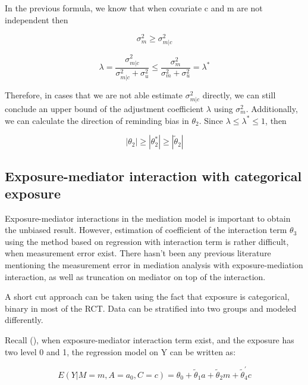 \documentclass{article}
\begin{document}
In the previous formula, we know that when covariate c and m are not independent then


\begin{equation}
\sigma^2_{m}  \ge \sigma^2_{m|c}
\end{equation}

\begin{equation}
 \lambda = \frac{\sigma_{m|c}^2}{\sigma_{m|c}^2 + \sigma_{u}^2} \le \frac{\sigma_{m}^2}{\sigma_{m}^2 + \sigma_{u}^2} = \lambda^*
\end{equation}



Therefore, in cases that we are not able estimate $\sigma^2_{m|c} $ directly, we can still conclude an upper bound of the adjustment coefficient $\lambda$ using $\sigma^2_m$. Additionally, we can calculate the direction of reminding bias in  $\theta_2$. Since $\lambda \le \lambda^* \le 1$, then 


\begin{equation}
|\theta_2| \ge   |\theta_2^*|  \ge |\tilde \theta_2|
\end{equation}



\subsection{Exposure-mediator interaction with categorical exposure}

Exposure-mediator interactions in the mediation model is important to obtain the unbiased result. However, estimation of coefficient of the interaction term $\theta_3$ using the method based on regression with interaction term is rather difficult, when measurement error exist. There hasn't been any previous literature mentioning the measurement error in mediation analysis with exposure-mediation interaction, as well as truncation on mediator on top of the interaction. 

A short cut approach can be taken using the fact that exposure is categorical, binary in most of the RCT. Data can be stratified into two groups and modeled differently.

Recall (), when exposure-mediator interaction term exist, and the exposure has two level 0 and 1, the regression model on Y can be written as:


\begin{equation}
E (Y |M = m,A = a_0,C = c) = \theta_0+\tilde \theta_1 a+ \tilde \theta_2 m + \tilde \theta_4^{'} c
\end{equation}
\end{document}
